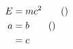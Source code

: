 \documentclass{ctexart}
\begin{document}
\begin{align}
E &= mc^2 \tag{\label{eq:Einstein}} \\ %
a &= b \tag{\label{eq:myeq}} \\
  &= c
\end{align}
\end{document}
